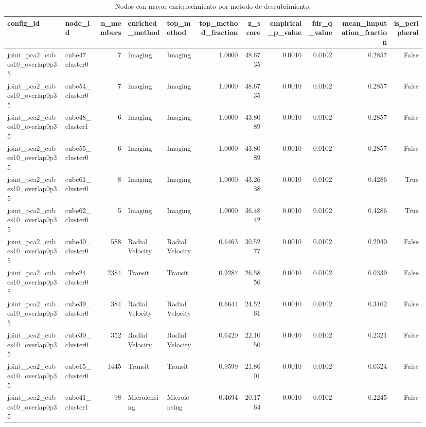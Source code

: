 \begin{table}[ht]
\centering
\caption{Nodos con mayor enriquecimiento por metodo de descubrimiento.}
\begin{tabular}{llrllrrrrrr}
\toprule
config\_id & node\_id & n\_members & enriched\_method & top\_method & top\_method\_fraction & z\_score & empirical\_p\_value & fdr\_q\_value & mean\_imputation\_fraction & is\_peripheral \\
\midrule
joint\_pca2\_cubes10\_overlap0p35 & cube47\_cluster0 & 7 & Imaging & Imaging & 1.0000 & 48.6735 & 0.0010 & 0.0102 & 0.2857 & False \\
joint\_pca2\_cubes10\_overlap0p35 & cube54\_cluster0 & 7 & Imaging & Imaging & 1.0000 & 48.6735 & 0.0010 & 0.0102 & 0.2857 & False \\
joint\_pca2\_cubes10\_overlap0p35 & cube48\_cluster1 & 6 & Imaging & Imaging & 1.0000 & 43.8089 & 0.0010 & 0.0102 & 0.2857 & False \\
joint\_pca2\_cubes10\_overlap0p35 & cube55\_cluster0 & 6 & Imaging & Imaging & 1.0000 & 43.8089 & 0.0010 & 0.0102 & 0.2857 & False \\
joint\_pca2\_cubes10\_overlap0p35 & cube61\_cluster0 & 8 & Imaging & Imaging & 1.0000 & 43.2638 & 0.0010 & 0.0102 & 0.4286 & True \\
joint\_pca2\_cubes10\_overlap0p35 & cube62\_cluster0 & 5 & Imaging & Imaging & 1.0000 & 36.4842 & 0.0010 & 0.0102 & 0.4286 & True \\
joint\_pca2\_cubes10\_overlap0p35 & cube40\_cluster0 & 588 & Radial Velocity & Radial Velocity & 0.6463 & 30.5277 & 0.0010 & 0.0102 & 0.2940 & False \\
joint\_pca2\_cubes10\_overlap0p35 & cube24\_cluster0 & 2384 & Transit & Transit & 0.9287 & 26.5856 & 0.0010 & 0.0102 & 0.0339 & False \\
joint\_pca2\_cubes10\_overlap0p35 & cube39\_cluster0 & 384 & Radial Velocity & Radial Velocity & 0.6641 & 24.5261 & 0.0010 & 0.0102 & 0.3162 & False \\
joint\_pca2\_cubes10\_overlap0p35 & cube30\_cluster0 & 352 & Radial Velocity & Radial Velocity & 0.6420 & 22.1050 & 0.0010 & 0.0102 & 0.2321 & False \\
joint\_pca2\_cubes10\_overlap0p35 & cube15\_cluster0 & 1445 & Transit & Transit & 0.9599 & 21.8601 & 0.0010 & 0.0102 & 0.0324 & False \\
joint\_pca2\_cubes10\_overlap0p35 & cube41\_cluster1 & 98 & Microlensing & Microlensing & 0.4694 & 20.1764 & 0.0010 & 0.0102 & 0.2245 & False \\

\end{tabular}
\end{table}
